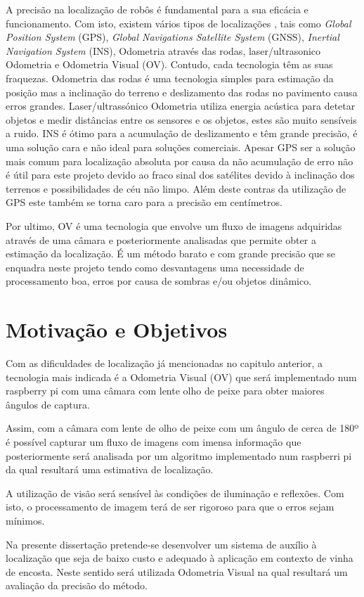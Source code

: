 A precisão na localização de robôs é fundamental para a sua eficácia e funcionamento. Com isto, existem vários tipos de localizações , tais como \textit{Global Position System} (GPS), \textit{Global Navigations Satellite System} (GNSS), \textit{Inertial Navigation System} (INS), Odometria através das rodas, laser/ultrasonico Odometria e Odometria Visual (OV). Contudo, cada tecnologia têm as suas fraquezas. Odometria das rodas é uma tecnologia simples para estimação da posição mas a inclinação do terreno e deslizamento das rodas no pavimento causa erros grandes. Laser/ultrassónico  Odometria utiliza energia acústica para detetar objetos e medir distâncias entre os sensores e os objetos, estes são muito sensíveis a ruido. INS é ótimo para a acumulação de deslizamento e têm grande precisão, é uma solução cara e não ideal para soluções comerciais. Apesar GPS ser a solução mais comum para localização absoluta por causa da não acumulação de erro não é útil para este projeto devido ao fraco sinal dos satélites devido à inclinação dos terrenos e possibilidades de céu não limpo. Além deste contras da utilização de GPS este também se torna caro para a precisão em centímetros. \cite{Aqel2016}

Por ultimo, OV é uma tecnologia que envolve um fluxo de imagens adquiridas através de uma câmara e posteriormente analisadas que permite obter a estimação da localização. É um método barato e com grande precisão que se enquadra neste projeto tendo como desvantagens uma necessidade de processamento boa, erros por causa de sombras e/ou objetos dinâmico.

\section{Motivação e Objetivos} \label{sec:context}

Com as dificuldades de localização já mencionadas no capitulo anterior, a tecnologia mais indicada é a Odometria Visual (OV) que será implementado num raspberry pi com uma câmara com lente olho de peixe para obter maiores ângulos de captura.

Assim, com a câmara com lente de olho de peixe com um ângulo de cerca de 180º é possível capturar um fluxo de imagens com imensa informação que posteriormente será analisada por um algoritmo implementado num raspberri pi da qual resultará uma estimativa de localização.

A utilização de visão será sensível às condições de iluminação e reflexões. Com isto, o processamento de imagem terá de ser rigoroso para que o erros sejam mínimos.

Na presente dissertação pretende-se desenvolver um sistema de auxílio à localização que seja de baixo custo e adequado à aplicação em contexto de vinha de encosta. Neste sentido será utilizada Odometria Visual na qual resultará um avaliação da precisão do método.
